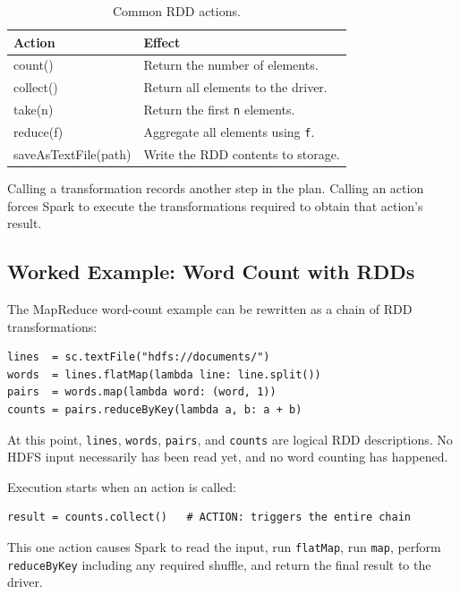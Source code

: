 \documentclass[11pt,a4paper,oneside]{book}
\begin{document}
\begin{table}[htbp]
\centering
\caption{Common RDD actions.}
\label{tab:spark-actions}
\begin{tabularx}{0.82\textwidth}{>{\ttfamily\raggedright\arraybackslash}p{4.1cm} Y}
\toprule
{}
\normalfont\bfseries Action & \normalfont\bfseries Effect \\
\midrule
count() & Return the number of elements. \\
collect() & Return all elements to the driver. \\
take(n) & Return the first \texttt{n} elements. \\
reduce(f) & Aggregate all elements using \texttt{f}. \\
saveAsTextFile(path) & Write the RDD contents to storage. \\
\bottomrule
\end{tabularx}
\end{table}

Calling a transformation records another step in the plan. Calling an action forces Spark to execute the transformations required to obtain that action's result.

\subsection{Worked Example: Word Count with RDDs}

The MapReduce word-count example can be rewritten as a chain of RDD transformations:

\begin{lstlisting}[style=sparkcode]
lines  = sc.textFile("hdfs://documents/")
words  = lines.flatMap(lambda line: line.split())
pairs  = words.map(lambda word: (word, 1))
counts = pairs.reduceByKey(lambda a, b: a + b)
\end{lstlisting}

At this point, \texttt{lines}, \texttt{words}, \texttt{pairs}, and \texttt{counts} are logical RDD descriptions. No HDFS input necessarily has been read yet, and no word counting has happened.

Execution starts when an action is called:

\begin{lstlisting}[style=sparkcode]
result = counts.collect()   # ACTION: triggers the entire chain
\end{lstlisting}

This one action causes Spark to read the input, run \texttt{flatMap}, run \texttt{map}, perform \texttt{reduceByKey} including any required shuffle, and return the final result to the driver.
\end{document}
